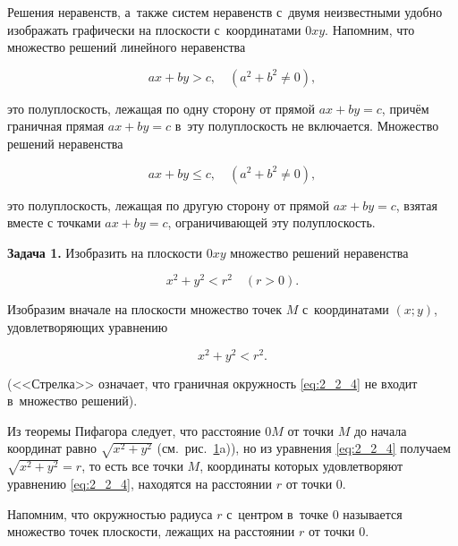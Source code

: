 
Решения неравенств, а~также систем неравенств с~двумя неизвестными удобно
изображать графически на плоскости с~координатами $0xy$.
Напомним, что множество решений линейного неравенства

\begin{equation}\label{eq:2_2_1}
ax + by > c, \quad (a^{2} + b^{2} \ne 0),
\end{equation}

\noindent
это полуплоскость, лежащая по одну сторону от прямой $ax + by = c$,
причём граничная прямая $ax + by = c$ в~эту полуплоскость не включается.
Множество решений неравенства

\begin{equation}\label{eq:2_2_1}
ax + by \leqslant c, \quad (a^{2} + b^{2} \ne 0),
\end{equation}

\noindent
это полуплоскость, лежащая по другую сторону от прямой $ax + by = c$,
взятая вместе с точками $ax + by = c$, ограничивающей эту полуплоскость.

\textbf{Задача 1.}\label{ex:2_2_1} Изобразить на плоскости $0xy$ множество решений неравенства

\begin{equation}\label{eq:2_2_3}
x^{2} + y^{2} < r^{2} \quad (r > 0).
\end{equation}

Изобразим вначале на плоскости множество точек $M$ с~координатами $(x; y)$,
удовлетворяющих уравнению

\begin{equation}\label{eq:2_2_4}
x^{2} + y^{2} < r^{2}.
\end{equation}

\begin{figure}\label{fig:2_2_1}
\end{figure}

\noindent
(<<Стрелка>> означает, что граничная окружность \eqref{eq:2_2_4} не входит
в~множество решений).

Из теоремы Пифагора следует, что расстояние $0M$ от точки $M$ до начала координат
равно $\sqrt{x^{2} + y^{2}}$ (см.\ рис.\ \ref{fig:2_2_1}a)), но из уравнения
\eqref{eq:2_2_4} получаем $\sqrt{x^{2} + y^{2}} = r$, то есть все точки $M$,
координаты которых удовлетворяют уравнению \eqref{eq:2_2_4}, находятся
на расстоянии $r$ от точки $0$.

Напомним, что окружностью радиуса $r$ с~центром в~точке $0$ называется множество
точек плоскости, лежащих на расстоянии $r$ от точки $0$.


